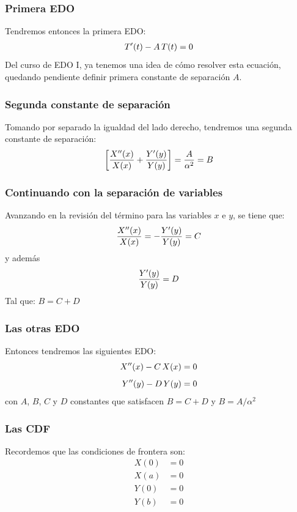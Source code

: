 \documentclass[12pt]{beamer}
\begin{document}
\begin{frame}
\frametitle{Primera EDO}
Tendremos entonces la primera EDO:
\begin{align}
{T}^{\prime}(t) - A \, T(t) = 0
\label{eq:ecuacion_02_195}
\end{align}
\pause
Del curso de EDO I, ya tenemos una idea de cómo resolver esta ecuación, quedando pendiente definir primera constante de separación $A$.
\end{frame}
\begin{frame}
\frametitle{Segunda constante de separación}
Tomando por separado la igualdad del lado derecho, tendremos una segunda constante de separación:
\pause
\begin{align*}
\left[ \dfrac{{X}^{\prime \prime}(x)}{X(x)} + \dfrac{{Y}^{\prime}(y)}{Y(y)} \right]  = \dfrac{A}{\alpha^{2}} = B
\end{align*}
\end{frame}
\begin{frame}
\frametitle{Continuando con la separación de variables}
Avanzando en la revisión del término para las variables $x$ e $y$, se tiene que:
\pause
\begin{align*}
\dfrac{{X}^{\prime \prime}(x)}{X(x)} = -  \dfrac{{Y}^{\prime}(y)}{Y(y)} = C
\end{align*}
\pause
y además
\begin{align*}
\dfrac{{Y}^{\prime}(y)}{Y(y)} = D
\end{align*}
Tal que: $B = C+ D$
\end{frame}
\begin{frame}
\frametitle{Las otras EDO}
Entonces tendremos las siguientes EDO:
\begin{align}
{X}^{\prime \prime}(x) - C \, X(x) = 0 \label{eq:ecuacion_02_196} \\[0.5em]
{Y}^{\prime \prime}(y) - D \, Y(y) = 0 \label{eq:ecuacion_02_197}
\end{align}
con $A$, $B$, $C$ y $D$ constantes que satisfacen $B = C + D$ y $B = A / \alpha^{2}$
\end{frame}
\begin{frame}
\frametitle{Las CDF}
Recordemos que las condiciones de frontera son:
\begin{align}
X(0) &= 0 \label{eq:ecuacion_02_198} \\[0.5em]
X(a) &= 0 \label{eq:ecuacion_02_199} \\[0.5em]
Y(0) &= 0 \label{eq:ecuacion_02_200} \\[0.5em]
Y(b) &= 0 \label{eq:ecuacion_02_201}
\end{align}
\end{frame}
\end{document}
